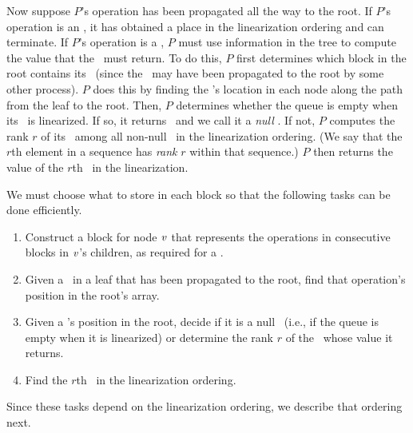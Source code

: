 Now suppose $P$'s operation has been propagated all the way to the root.
If $P$'s operation is an \enqueue, it has obtained a place in the linearization ordering and can terminate.
If $P$'s operation is a \dequeue, $P$ must use information in the tree to compute the value that the
\dequeue\ must return.  To do this, $P$ first determines which block in the root contains its 
\dequeue\ (since the \dequeue\ may have been propagated to the root by some other process).
$P$ does this by finding the \dequeue's location in each node along the path from the leaf to the root.
Then, $P$ determines whether the queue is empty when its \dequeue\ is linearized. 
If so, it returns \nl\ and we call it a \emph{null \dequeue}.
If not, $P$ computes the rank $r$ of its \dequeue\ among all non-null \dequeues\ in the linearization ordering.  (We say that the $r$th element in a sequence has \emph{rank} $r$ within that sequence.)
$P$ then returns the value of the $r$th \enqueue\ in the linearization.

We must choose what to store in each block so that the following tasks can be done efficiently.
\begin{enumerate}[label={(T\arabic*)}]
\item
\label{construct}
Construct a block for node $\mbox{\textnormal{\textit{v}}}$ that represents the operations in consecutive blocks in $\mbox{\textnormal{\textit{v}}}$'s children, as required for a .
\item
\label{findinroot}
Given a \dequeue\ in a leaf that has been propagated to the root, find that operation's position in the root's  array.
\item
\label{findrank}
Given a \dequeue's position in the root, decide if it is a null \dequeue\ (i.e., if the queue is empty when it is linearized)
or determine the rank $r$ of the \enqueue\ whose value it returns.
\item
\label{findenqueue}
Find the $r$th \enqueue\ in the linearization ordering.
\end{enumerate}
Since these tasks depend on the linearization ordering, we describe that ordering next.

